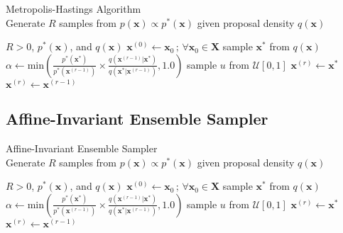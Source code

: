 \begin{algorithm}
\caption[Metropolis-Hastings Algorithm]{Metropolis-Hastings Algorithm \\ Generate $R$ samples from $p(\bm{x}) \propto p^*(\bm{x})$ given proposal density $q (\bm{x})$}
\label{alg:metropolis_hastings}
\begin{algorithmic}
  \REQUIRE $R > 0$, $p^*(\bm{x})$, and $q (\bm{x})$
  \STATE $\bm{x}^{(0)} \leftarrow \bm{x}_0 \, ; \, \forall \bm{x}_0 \in \mathbf{X}$
    \STATE sample $\bm{x}^*$ from $q(\bm{x})$
    \STATE $\alpha \leftarrow \text{min} \left(\frac{p^*(\bm{x}^*)}{p^*(\bm{x}^{(r-1)})} \times \frac{q(\bm{x}^{(r-1)} | \bm{x}^*)}{q(\bm{x}^* | \bm{x}^{(r-1)})}, 1.0\right)$
    \STATE sample $u$ from $\mathcal{U}[0,1]$
      \STATE $\bm{x}^{(r)} \leftarrow \bm{x}^*$
    \ELSE
      \STATE $\bm{x}^{(r)} \leftarrow \bm{x}^{(r-1)}$
    \ENDIF
  \ENDFOR
\end{algorithmic}
\end{algorithm}



\subsection{Affine-Invariant Ensemble Sampler}\label{sub:bc_mcmc_aies}






\begin{algorithm}
\caption[Affine-Invariant Ensemble Sample]{Affine-Invariant Ensemble Sampler \\ Generate $R$ samples from $p(\bm{x}) \propto p^*(\bm{x})$ given proposal density $q (\bm{x})$}
\label{alg:aies}
\begin{algorithmic}
  \REQUIRE $R > 0$, $p^*(\bm{x})$, and $q (\bm{x})$
  \STATE $\bm{x}^{(0)} \leftarrow \bm{x}_0 \, ; \, \forall \bm{x}_0 \in \mathbf{X}$
    \STATE sample $\bm{x}^*$ from $q(\bm{x})$
    \STATE $\alpha \leftarrow \text{min} \left(\frac{p^*(\bm{x}^*)}{p^*(\bm{x}^{(r-1)})} \times \frac{q(\bm{x}^{(r-1)} | \bm{x}^*)}{q(\bm{x}^* | \bm{x}^{(r-1)})}, 1.0\right)$
    \STATE sample $u$ from $\mathcal{U}[0,1]$
      \STATE $\bm{x}^{(r)} \leftarrow \bm{x}^*$
    \ELSE
      \STATE $\bm{x}^{(r)} \leftarrow \bm{x}^{(r-1)}$
    \ENDIF
  \ENDFOR
\end{algorithmic}
\end{algorithm}


